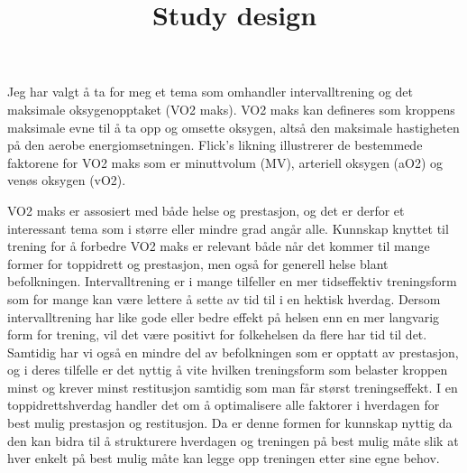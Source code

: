 \documentclass[
  letterpaper,
  DIV=11,
  numbers=noendperiod]{scrartcl}
\title{Study design}
\author{}
\date{}
\begin{document}
\maketitle
\ifdefined\Shaded\renewenvironment{Shaded}{\begin{tcolorbox}[enhanced, sharp corners, frame hidden, boxrule=0pt, interior hidden, breakable, borderline west={3pt}{0pt}{shadecolor}]}{\end{tcolorbox}}\fi

Jeg har valgt å ta for meg et tema som omhandler intervalltrening og det
maksimale oksygenopptaket (VO2 maks). VO2 maks kan defineres som
kroppens maksimale evne til å ta opp og omsette oksygen, altså den
maksimale hastigheten på den aerobe energiomsetningen. Flick's likning
illustrerer de bestemmede faktorene for VO2 maks som er minuttvolum
(MV), arteriell oksygen (aO2) og venøs oksygen (vO2).

VO2 maks er assosiert med både helse og prestasjon, og det er derfor et
interessant tema som i større eller mindre grad angår alle. Kunnskap
knyttet til trening for å forbedre VO2 maks er relevant både når det
kommer til mange former for toppidrett og prestasjon, men også for
generell helse blant befolkningen. Intervalltrening er i mange tilfeller
en mer tidseffektiv treningsform som for mange kan være lettere å sette
av tid til i en hektisk hverdag. Dersom intervalltrening har like gode
eller bedre effekt på helsen enn en mer langvarig form for trening, vil
det være positivt for folkehelsen da flere har tid til det. Samtidig har
vi også en mindre del av befolkningen som er opptatt av prestasjon, og i
deres tilfelle er det nyttig å vite hvilken treningsform som belaster
kroppen minst og krever minst restitusjon samtidig som man får størst
treningseffekt. I en toppidrettshverdag handler det om å optimalisere
alle faktorer i hverdagen for best mulig prestasjon og restitusjon. Da
er denne formen for kunnskap nyttig da den kan bidra til å strukturere
hverdagen og treningen på best mulig måte slik at hver enkelt på best
mulig måte kan legge opp treningen etter sine egne behov.
\end{document}
